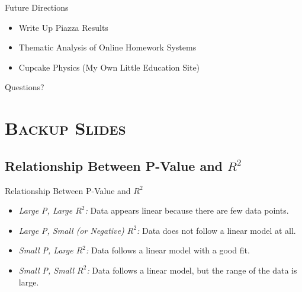 \documentclass[xcolor=x11names,compress]{beamer}
\begin{document}
\begin{frame}{Future Directions}
	\begin{itemize}
		\item Write Up Piazza Results
		\item Thematic Analysis of Online Homework Systems
		\item Cupcake Physics (My Own Little Education Site)
	\end{itemize}
\end{frame}

\begin{frame}{}
	\begin{center}
		{\large Questions?}
	\end{center}
\end{frame}


\appendix
\section{\scshape Backup Slides}

\subsection{Relationship Between P-Value and $R^2$}

\begin{frame}{Relationship Between P-Value and $R^2$}
	\begin{itemize}
		\item \textit{Large P, Large $R^2$:}\newline
		Data appears linear because there are few data points.
		\vspace{2mm}
		\item \textit{Large P, Small (or Negative) $R^2$:}\newline
		Data does not follow a linear model at all.
		\vspace{2mm}
		\item \textit{Small P, Large $R^2$:}\newline
		Data follows a linear model with a good fit.
		\vspace{2mm}
		\item \textit{Small P, Small $R^2$:}\newline
		Data follows a linear model, but the range of the data is large.
	\end{itemize}
\end{frame}
\end{document}
